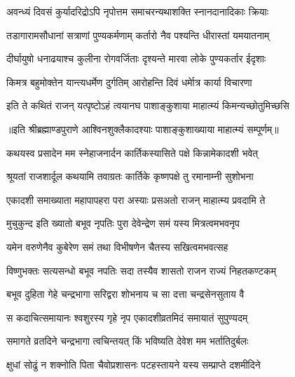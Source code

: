 \twolineshloka
{अवन्ध्यं दिवसं कुर्यादरिद्रोऽपि नृपोत्तम}
{समाचरन्यथाशक्ति स्नानदानादिकाः क्रियाः} %

\twolineshloka
{तडागारामसौधानां सत्राणां पुण्यकर्मणाम्}
{कर्तारो नैव पश्यन्ति धीरास्तां यमयातनाम्} %

\twolineshloka
{दीर्घायुषो धनाढयाश्च कुलीना रोगवर्जिताः}
{दृश्यन्ते मारवा लोके पुण्यकर्तार ईदृशाः} %

\twolineshloka
{किमत्र बहुमोक्तेन यान्त्यधर्मेण दुर्गतिम्}
{आरोहन्ति दिवं धर्मेात्र कार्या विचारणा} %

\twolineshloka
{इति ते कथितं राजन् यत्पृष्टोऽहं त्वयानघ}
{पाशाङ्कुशाया माहात्म्यं किमन्यच्छोतुमिच्छसि} %

॥इति श्रीब्रह्माण्डपुराणे आश्विनशुक्लैकादश्याः पाशाङ्कुशाख्याया माहात्म्यं सम्पूर्णम्॥


\hyperref[sec:ekadashi_mahatmyam_vrata_raja]{\closesub}
\clearpage

\label{sec:vrata-raja-karttika-krishna-rama}


\twolineshloka
{कथयस्व प्रसादेन मम स्नेहाजनार्दन}
{कार्तिकस्यासिते पक्षे किन्नामेकादशी भवेत्} %


\twolineshloka
{श्रूयतां राजशार्दूल कथयामि तवाग्रतः}
{कार्तिके कृष्णपक्षे तु रमानाम्नी सुशोभना} %

\twolineshloka
{एकादशी समाख्याता महापापहरा परा}
{अस्याः प्रसअतो राजन् माहात्म्य प्रवदामि ते} %

\twolineshloka
{मुचुकुन्द इति ख्यातो बभूव नृपतिः पुरा}
{देवेन्द्रेण समं यस्य मित्रत्वमभवनृप} %

\twolineshloka
{यमेन वरुणेनैव कुबेरेण समं तथा}
{विभीषणेन चैतस्य सखित्वमभवत्सह} %

\twolineshloka
{विष्णुभक्तः सत्यसन्धो बभूव नपतिः सदा}
{तस्यैव शासतो राजन राज्यं निहतकण्टकम्} %

\twolineshloka
{बभूव दुहिता गेहे चन्द्रभागा सरिद्वरा}
{शोभनाय च सा दत्ता चन्द्रसेनसुताय वै} %

\twolineshloka
{स कदाचित्समायानः श्वशुरस्य गृहे नृप}
{एकादशीव्रतमिदं समायातं सुपुण्यदम्} %

\twolineshloka
{समागते व्रतदिने चन्द्रभागा त्वचिन्तयत्}
{किं भविष्यति देवेश मम भर्तातिदुर्बलः} %

\twolineshloka
{क्षुधां सोढुं न शक्नोति पिता चैवोप्रशासनः}
{पटहस्तायने यस्य सम्प्राप्ते दशमीदिने} %

